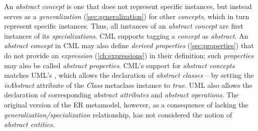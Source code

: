 \begin{definition}
An \emph{abstract concept} is one that does not represent specific instances,
but instead serves as a \emph{generalization} (\ref{sec:generalization}) 
for other \emph{concepts},
which in turn represent specific instances.
Thus, all instances of an \emph{abstract concept}
are first instances of its \emph{specializations}.
CML supports tagging a \emph{concept} as \emph{abstract}.
An \emph{abstract concept} in CML may also define \emph{derived properties} (\ref{sec:properties})
that do not provide an \emph{expression} (\ref{ch:expressions}) in their definition;
such \emph{properties} may also be called \emph{abstract properties}.
CML's support for \emph{abstract concepts} matches UML's \cite{uml},
which allows the declaration of \emph{abstract classes}
-- by setting the \emph{isAbstract} attribute of the \emph{Class} metaclass instance to \emph{true}.
UML also allows the declaration of corresponding \emph{abstract attributes} and \emph{abstract operations}.
The original version of the ER \cite{er} metamodel, however,
as a consequence of lacking the \emph{generalization/specialization} relationship,
has not considered the notion of \emph{abstract entities}.
\end{definition}
